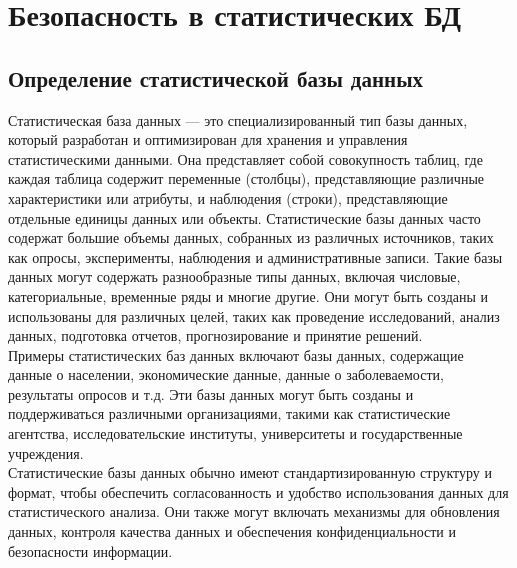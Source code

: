 \section{Безопасность в статистических БД}

\subsection{Определение статистической базы данных}

Статистическая база данных — это специализированный тип базы данных, который разработан и оптимизирован для хранения и управления статистическими данными. Она представляет собой совокупность таблиц, где каждая таблица содержит переменные (столбцы), представляющие различные характеристики или атрибуты, и наблюдения (строки), представляющие отдельные единицы данных или объекты. Статистические базы данных часто содержат большие объемы данных, собранных из различных источников, таких как опросы, эксперименты, наблюдения и административные записи. Такие базы данных могут содержать разнообразные типы данных, включая числовые, категориальные, временные ряды и многие другие. Они могут быть созданы и использованы для различных целей, таких как проведение исследований, анализ данных, подготовка отчетов, прогнозирование и принятие решений.
\\

Примеры статистических баз данных включают базы данных, содержащие данные о населении, экономические данные, данные о заболеваемости, результаты опросов и т.д. Эти базы данных могут быть созданы и поддерживаться различными организациями, такими как статистические агентства, исследовательские институты, университеты и государственные учреждения.
\\

Статистические базы данных обычно имеют стандартизированную структуру и формат, чтобы обеспечить согласованность и удобство использования данных для статистического анализа. Они также могут включать механизмы для обновления данных, контроля качества данных и обеспечения конфиденциальности и безопасности информации.
\\

